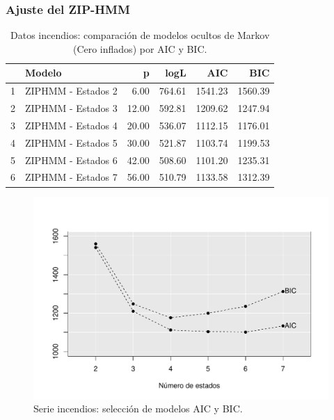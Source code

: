 \documentclass[a4paper]{article}\usepackage[]{graphicx}\usepackage[]{color}
\makeatletter
\def\maxwidth{ %
  \ifdim\Gin@nat@width>\linewidth
    \linewidth
  \else
    \Gin@nat@width
  \fi
}
\newenvironment{knitrout}{}{} %
\makeatother
\begin{document}
\subsubsection{Ajuste del ZIP-HMM}



\begin{table}[ht]
\centering
\begin{tabular}{rlrrrr}
  \hline
 & Modelo & p & logL & AIC & BIC \\ 
  \hline
1 & ZIPHMM - Estados 2 & 6.00 & 764.61 & 1541.23 & 1560.39 \\ 
  2 & ZIPHMM - Estados 3 & 12.00 & 592.81 & 1209.62 & 1247.94 \\ 
  3 & ZIPHMM - Estados 4 & 20.00 & 536.07 & 1112.15 & 1176.01 \\ 
  4 & ZIPHMM - Estados 5 & 30.00 & 521.87 & 1103.74 & 1199.53 \\ 
  5 & ZIPHMM - Estados 6 & 42.00 & 508.60 & 1101.20 & 1235.31 \\ 
  6 & ZIPHMM - Estados 7 & 56.00 & 510.79 & 1133.58 & 1312.39 \\ 
   \hline
\end{tabular}
\caption{Datos incendios: comparación de modelos ocultos de Markov (Cero inflados) por AIC y BIC.} 
\end{table}


\begin{knitrout}
\color{fgcolor}\begin{figure}[h]
\includegraphics[width=\maxwidth]{figure/unnamed-chunk-43-1} \caption[Serie incendios]{Serie incendios: selección de modelos AIC y BIC.}\label{fig:unnamed-chunk-43}
\end{figure}


\end{knitrout}
\end{document}
